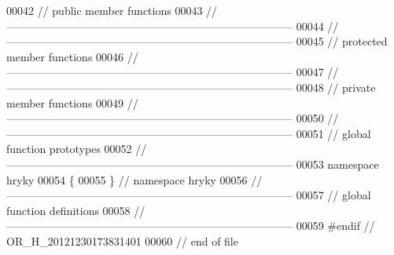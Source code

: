 \begin{DoxyCode}
00042 \textcolor{comment}{// public member functions}
00043 \textcolor{comment}{//
      ------------------------------------------------------------------------------}
00044 \textcolor{comment}{//
      ------------------------------------------------------------------------------}
00045 \textcolor{comment}{// protected member functions}
00046 \textcolor{comment}{//
      ------------------------------------------------------------------------------}
00047 \textcolor{comment}{//
      ------------------------------------------------------------------------------}
00048 \textcolor{comment}{// private member functions}
00049 \textcolor{comment}{//
      ------------------------------------------------------------------------------}
00050 \textcolor{comment}{//
      ------------------------------------------------------------------------------}
00051 \textcolor{comment}{// global function prototypes}
00052 \textcolor{comment}{//
      ------------------------------------------------------------------------------}
00053 \textcolor{keyword}{namespace }hryky
00054 \{
00055 \} \textcolor{comment}{// namespace hryky}
00056 \textcolor{comment}{//
      ------------------------------------------------------------------------------}
00057 \textcolor{comment}{// global function definitions}
00058 \textcolor{comment}{//
      ------------------------------------------------------------------------------}
00059 \textcolor{preprocessor}{#endif // OR\_H\_20121230173831401}
00060 \textcolor{preprocessor}{}\textcolor{comment}{// end of file}
\end{DoxyCode}

